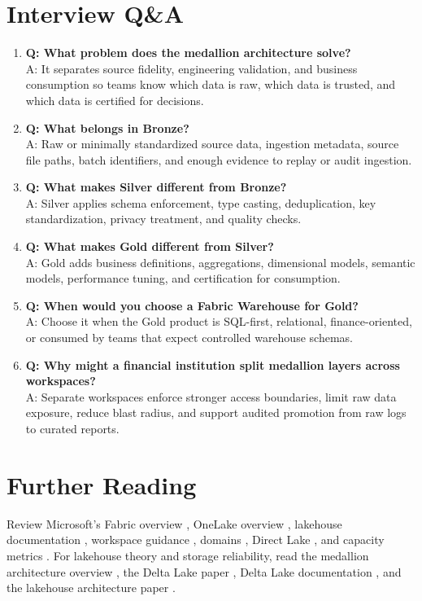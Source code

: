 \section{Interview Q\&A}
\begin{enumerate}
    \item \textbf{Q: What problem does the medallion architecture solve?}\\
    A: It separates source fidelity, engineering validation, and business consumption so teams know which data is raw, which data is trusted, and which data is certified for decisions.
    \item \textbf{Q: What belongs in Bronze?}\\
    A: Raw or minimally standardized source data, ingestion metadata, source file paths, batch identifiers, and enough evidence to replay or audit ingestion.
    \item \textbf{Q: What makes Silver different from Bronze?}\\
    A: Silver applies schema enforcement, type casting, deduplication, key standardization, privacy treatment, and quality checks.
    \item \textbf{Q: What makes Gold different from Silver?}\\
    A: Gold adds business definitions, aggregations, dimensional models, semantic models, performance tuning, and certification for consumption.
    \item \textbf{Q: When would you choose a Fabric Warehouse for Gold?}\\
    A: Choose it when the Gold product is SQL-first, relational, finance-oriented, or consumed by teams that expect controlled warehouse schemas.
    \item \textbf{Q: Why might a financial institution split medallion layers across workspaces?}\\
    A: Separate workspaces enforce stronger access boundaries, limit raw data exposure, reduce blast radius, and support audited promotion from raw logs to curated reports.
\end{enumerate}

\section{Further Reading}
Review Microsoft's Fabric overview \cite{microsoftFabricOverview}, OneLake overview \cite{microsoftOneLakeOverview}, lakehouse documentation \cite{microsoftFabricLakehouse}, workspace guidance \cite{microsoftFabricWorkspaces}, domains \cite{microsoftDomains}, Direct Lake \cite{microsoftDirectLake}, and capacity metrics \cite{microsoftFabricMetricsApp}. For lakehouse theory and storage reliability, read the medallion architecture overview \cite{databricksMedallion}, the Delta Lake paper \cite{armbrust2020delta}, Delta Lake documentation \cite{deltaLakeDocs}, and the lakehouse architecture paper \cite{armbrust2021lakehouse}.

